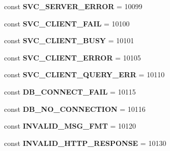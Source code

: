 \begin{DoxyCompactItemize}
\item 
\hypertarget{class_able_polecat___error_aa15e0a3518424e590208352e32b57618}{}const {\bfseries S\+V\+C\+\_\+\+S\+E\+R\+V\+E\+R\+\_\+\+E\+R\+R\+O\+R} = 10099\label{class_able_polecat___error_aa15e0a3518424e590208352e32b57618}

\item 
\hypertarget{class_able_polecat___error_a93d73bb599311b94f407acd7212c2a1b}{}const {\bfseries S\+V\+C\+\_\+\+C\+L\+I\+E\+N\+T\+\_\+\+F\+A\+I\+L} = 10100\label{class_able_polecat___error_a93d73bb599311b94f407acd7212c2a1b}

\item 
\hypertarget{class_able_polecat___error_ac881d004fa717b02957ef96fb2b85af0}{}const {\bfseries S\+V\+C\+\_\+\+C\+L\+I\+E\+N\+T\+\_\+\+B\+U\+S\+Y} = 10101\label{class_able_polecat___error_ac881d004fa717b02957ef96fb2b85af0}

\item 
\hypertarget{class_able_polecat___error_abfe94774f5124dae767b4211ff790276}{}const {\bfseries S\+V\+C\+\_\+\+C\+L\+I\+E\+N\+T\+\_\+\+E\+R\+R\+O\+R} = 10105\label{class_able_polecat___error_abfe94774f5124dae767b4211ff790276}

\item 
\hypertarget{class_able_polecat___error_a25f5ddc3072ec0d062c139384cb0cde8}{}const {\bfseries S\+V\+C\+\_\+\+C\+L\+I\+E\+N\+T\+\_\+\+Q\+U\+E\+R\+Y\+\_\+\+E\+R\+R} = 10110\label{class_able_polecat___error_a25f5ddc3072ec0d062c139384cb0cde8}

\item 
\hypertarget{class_able_polecat___error_a77cae951bf274bead9549f52eab0116c}{}const {\bfseries D\+B\+\_\+\+C\+O\+N\+N\+E\+C\+T\+\_\+\+F\+A\+I\+L} = 10115\label{class_able_polecat___error_a77cae951bf274bead9549f52eab0116c}

\item 
\hypertarget{class_able_polecat___error_a94fa6c6351b1d03a719b0a905b47e19a}{}const {\bfseries D\+B\+\_\+\+N\+O\+\_\+\+C\+O\+N\+N\+E\+C\+T\+I\+O\+N} = 10116\label{class_able_polecat___error_a94fa6c6351b1d03a719b0a905b47e19a}

\item 
\hypertarget{class_able_polecat___error_a31c53bbda5fc66b4a8588f6c5d4e5257}{}const {\bfseries I\+N\+V\+A\+L\+I\+D\+\_\+\+M\+S\+G\+\_\+\+F\+M\+T} = 10120\label{class_able_polecat___error_a31c53bbda5fc66b4a8588f6c5d4e5257}

\item 
\hypertarget{class_able_polecat___error_a547199d68cffe6ae7932339b2efa259b}{}const {\bfseries I\+N\+V\+A\+L\+I\+D\+\_\+\+H\+T\+T\+P\+\_\+\+R\+E\+S\+P\+O\+N\+S\+E} = 10130\label{class_able_polecat___error_a547199d68cffe6ae7932339b2efa259b}


\end{DoxyCompactItemize}
